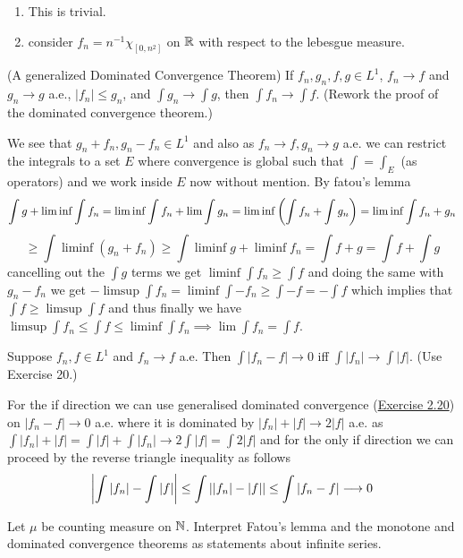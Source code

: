 \documentclass[12pt,a4paper]{article}
\begin{document}
\begin{solution}
\begin{enumerate}[label=\alph*.]
\item This is trivial.
\item consider $f_n=n^{-1}\chi_{[0,n^2]}$ on $\mathbb{R}$ with respect to the lebesgue measure.
\end{enumerate}
\end{solution}
\begin{problem}\label{prob:2-20}
(A generalized Dominated Convergence Theorem) If $f_n, g_n, f, g \in L^1$, $f_n \to f$ and $g_n \to g$ a.e., $|f_n| \le g_n$, and $\int g_n \to \int g$, then $\int f_n \to \int f$. (Rework the proof of the dominated convergence theorem.)
\end{problem}
\begin{solution}
We see that $g_n+f_n,g_n-f_n\in L^1$ and also as $f_n\to f,g_n\to g$ a.e. we can restrict the integrals to a set $E$ where convergence is global such that $\int=\int_E$ (as operators) and we work inside $E$ now without mention. 
By fatou's lemma
$$\int g+\liminf\int f_n=\liminf\int f_n+\lim\int g_n=\liminf\qty(\int f_n+\int g_n)=\liminf\int f_n+g_n$$
$$\geq\int\liminf(g_n+f_n)\geq\int\liminf g+\liminf f_n=\int f+g=\int f+\int g$$
cancelling out the $\int g$ terms we get $\liminf\int f_n\geq \int f$ and doing the same with $g_n-f_n$ we get $-\limsup\int f_n=\liminf\int-f_n\geq\int -f=-\int f$ which implies that $\int f\geq\limsup\int f$ and thus finally we have $\limsup\int f_n\leq\int f\leq\liminf\int f_n\implies\lim\int f_n=\int f$.
\end{solution}
\begin{problem}\label{prob:2-21}
Suppose $f_n, f \in L^1$ and $f_n \to f$ a.e. Then $\int |f_n - f| \to 0$ iff $\int |f_n| \to \int |f|$. (Use Exercise 20.)
\end{problem}
\begin{solution}
	For the if direction we can use generalised dominated convergence (\hyperref[prob:2-20]{Exercise 2.20}) on $|f_n-f|\to 0$ a.e. where it is dominated by $|f_n|+|f|\to 2|f|$ a.e. as $\int |f_n|+|f|=\int|f|+\int|f_n|\to 2\int|f|=\int2|f|$ and for the only if direction we can proceed by the reverse triangle inequality as follows
\[
	\qty|{\int |f_n|-\int|f|}|\leq\int||f_n|-|f||\leq\int|f_n-f|\longrightarrow 0
\]
\end{solution}
\begin{problem}\label{prob:2-22}
Let $\mu$ be counting measure on $\mathbb{N}$. Interpret Fatou's lemma and the monotone and dominated convergence theorems as statements about infinite series.
\end{problem}
\end{document}
